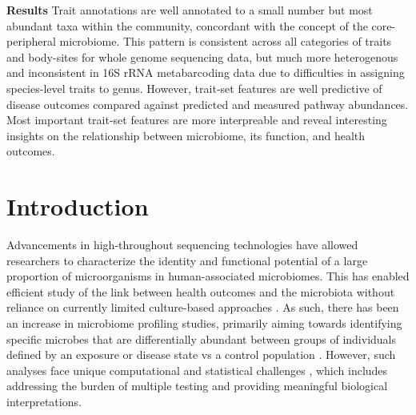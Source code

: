 \documentclass[10pt,letterpaper]{article}
\begin{document}
\noindent \textbf{Results} Trait annotations are well annotated to a small number but most abundant taxa within the community, concordant with the concept of the core-peripheral microbiome. This pattern is consistent across all categories of traits and body-sites for whole genome sequencing data, but much more heterogenous and inconsistent in 16S rRNA metabarcoding data due to difficulties in assigning species-level traits to genus. However, trait-set features are well predictive of disease outcomes compared against predicted and measured pathway abundances. Most important trait-set features are more interpreable and reveal interesting insights on the relationship between microbiome, its function, and health outcomes. 


\linenumbers

\section*{Introduction}

Advancements in high-throughout sequencing technologies have allowed researchers to characterize the identity and functional potential of a large proportion of microorganisms in human-associated microbiomes. This has enabled efficient study of the link between health outcomes and the microbiota without reliance on currently limited culture-based approaches \cite{lagier2016culture}. As such, there has been an increase in microbiome profiling studies, primarily aiming towards identifying specific microbes that are differentially abundant between groups of individuals defined by an exposure or disease state vs a control population \cite{zhang2019advancing}. However, such analyses face unique computational and statistical challenges \cite{li2019statisticala}, which includes addressing the burden of multiple testing and providing meaningful biological interpretations.  
\end{document}
